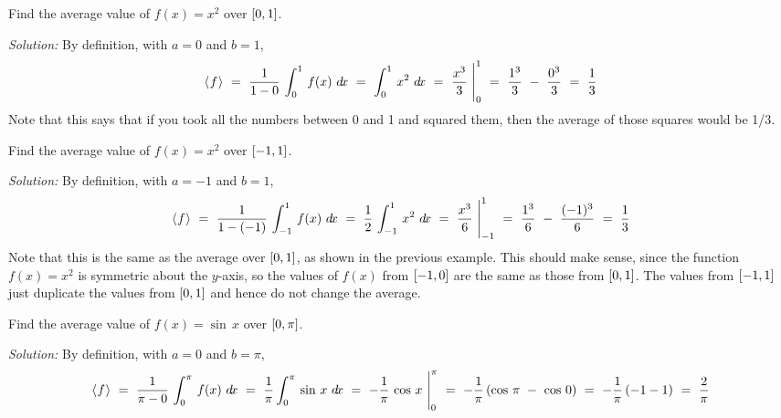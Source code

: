 
\begin{exmp}\label{exmp:avg1}
\noindent Find the average value of $f(x)=x^2$ over $\lbrack 0,1 \rbrack$.\vspace{1mm}
\par\noindent\emph{Solution:} By definition, with $a=0$ and $b=1$,
\[
\langle\mspace{1mu}f\mspace{1mu}\rangle ~=~ \frac{1}{1-0}\,\int_0^1\,f(x)~d\!x ~=~ \int_0^1\,x^2~d\!x ~=~
\frac{x^3}{3}~\Biggr|_0^1 ~=~ \frac{1^3}{3} ~-~ \frac{0^3}{3} ~=~ \frac{1}{3}
\]
Note that this says that if you took all the numbers between 0 and 1 and
squared them, then the average of those squares would be 1/3.
\end{exmp}
\begin{exmp}\label{exmp:avg2}
\noindent Find the average value of $f(x)=x^2$ over $\lbrack -1,1 \rbrack$.\vspace{1mm}
\par\noindent\emph{Solution:} By definition, with $a=-1$ and $b=1$,
\[
\langle\mspace{1mu}f\mspace{1mu}\rangle ~=~ \frac{1}{1-(-1)}\,\int_{-1}^1\,f(x)~d\!x ~=~ \frac{1}{2}\,\int_{-1}^1\,x^2~d\!x ~=~
\frac{x^3}{6}~\Biggr|_{-1}^1 ~=~ \frac{1^3}{6} ~-~ \frac{(-1)^3}{6} ~=~ \frac{1}{3}
\]
Note that this is the same as the average over $\lbrack 0,1 \rbrack$, as shown in the
previous example. This should make sense, since the function $f(x)=x^2$ is
symmetric about the $y$-axis, so the values of $f(x)$ from $\lbrack -1,0 \rbrack$ are
the same as those from $\lbrack 0,1 \rbrack$. The values from $\lbrack -1,1 \rbrack$ just
duplicate the values from $\lbrack 0,1 \rbrack$ and hence do not change the average.
\end{exmp}
\begin{exmp}\label{exmp:avg3}
\noindent Find the average value of $f(x)=\sin\,x$ over $\lbrack 0,\pi \rbrack$.\vspace{1mm}
\par\noindent\emph{Solution:} By definition, with $a=0$ and $b=\pi$,
\[
\langle\mspace{1mu}f\mspace{1mu}\rangle ~=~ \frac{1}{\pi-0}\,\int_0^{\pi}\,f(x)~d\!x ~=~ \frac{1}{\pi}\int_0^{\pi}\,\sin\,x~d\!x ~=~
-\frac{1}{\pi}\,\cos\,x~\Biggr|_0^{\pi} ~=~ -\frac{1}{\pi}\,(\cos\,\pi ~-~ \cos\,0) ~=~
-\frac{1}{\pi}\,(-1 - 1) ~=~ \frac{2}{\pi}
\]
\end{exmp}
